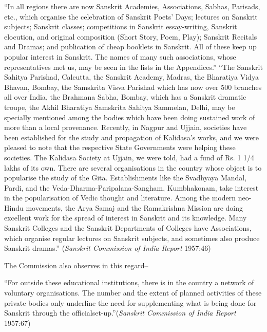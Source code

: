 \begin{myquote}
\eleven
“In all regions there are now Sanskrit Academies, Associations, Sabhas, Parisads, etc., which organise the celebration of Sanskrit Poets' Days; lectures on Sanskrit subjects; Sanskrit classes; competitions in Sanskrit essay-writing, Sanskrit elocution, and original composition (Short Story, Poem, Play); Sanskrit Recitals and Dramas; and publication of cheap booklets in Sanskrit. All of these keep up popular interest in Sanskrit. The names of many such associations, whose representatives met us, may be seen in the lists in the Appendices.” 
“The Sanskrit Sahitya Parishad, Calcutta, the Sanskrit Academy, Madras, the Bharatiya Vidya Bhavan, Bombay, the Samskrita Visva Parishad which has now over 500 branches all over India, the Brahmana Sabha, Bombay, which has a Sanskrit dramatic troupe, the Akhil Bharatiya Samskrita Sahitya Sammelan, Delhi, may be specially mentioned among the bodies which have been doing sustained work of more than a local provenance. Recently, in Nagpur and Ujjain, societies have been established for the study and propagation of Kalidasa's works, and we were pleased to note that the respective State Governments were helping these societies. The Kalidasa Society at Ujjain, we were told, had a fund of Rs. 1 1/4 lakhs of its own. There are several organisations in the country whose object is to popularise the study of the Gita. Establishments like the Svadhyaya Mandal, Pardi, and the Veda-Dharma-Paripalana-Sangham, Kumbhakonam, take interest in the popularisation of Vedic thought and literature. Among the modern neo-Hindu movements, the Arya Samaj and the Ramakrishna Mission are doing excellent work for the spread of interest in Sanskrit and its knowledge. Many Sanskrit Colleges and the Sanskrit Departments of Colleges have Associations, which organise regular lectures on Sanskrit subjects, and sometimes also produce Sanskrit dramas.” \hfill({\sl Sanskrit Commission of India Report} 1957:46)
\end{myquote}

The Commission also observes in this regard–
\begin{myquote}
\eleven
 “For outside these educational institutions, there is in the country a network of voluntary organisations. The number and the extent of planned activities of these private bodies only underline the need for supplementing what is being done for Sanskrit through the official\break set-up.”\hfill({\sl Sanskrit Commission of India Report} 1957:67)
\end{myquote}

